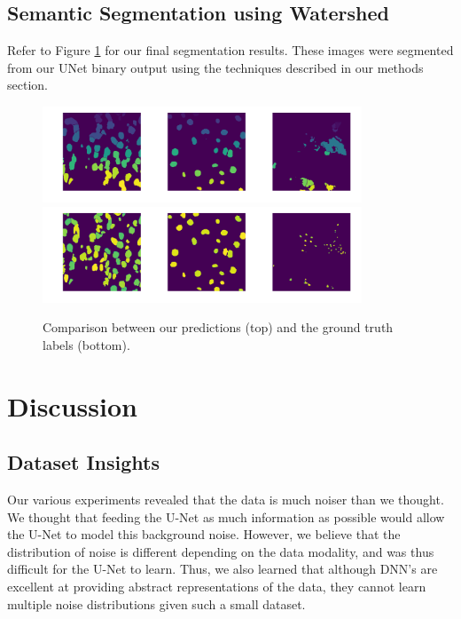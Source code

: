 \documentclass[paper=letter, fontsize=12pt]{article}
\numberwithin{equation}{section} %
\numberwithin{figure}{section} %
\numberwithin{table}{section} %
\begin{document}
\subsection{Semantic Segmentation using Watershed}

Refer to Figure \ref{fig:segmentation} for our final segmentation results.  
These images were segmented from our UNet binary output using the techniques
described in our methods section.

\begin{figure}[H]
    \centering
    \includegraphics[width=0.85\textwidth]{./figs/segmentation.png}
    \includegraphics[width=0.85\textwidth]{./figs/ground-truth.png}
    \caption{Comparison between our predictions (top) and the ground truth
    labels (bottom).}
    \label{fig:segmentation}
\end{figure}

\section{Discussion}

\subsection{ Dataset Insights }

Our various experiments revealed that the data is much noiser than we thought.
We thought that feeding the U-Net as much information as possible would allow
the U-Net to model this background noise. However, we believe that the
distribution of noise is different depending on the data modality, and was thus
difficult for the U-Net to learn. Thus, we also learned that although DNN's are
excellent at providing abstract representations of the data, they cannot learn
multiple noise distributions given such a small dataset.
\end{document}

